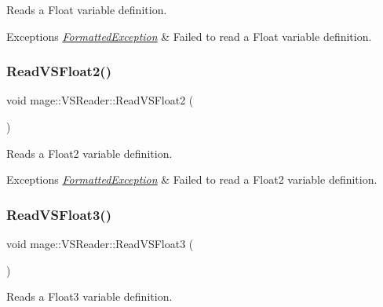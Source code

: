 Reads a Float variable definition.


\begin{DoxyExceptions}{Exceptions}
{\em \hyperlink{structmage_1_1_formatted_exception}{Formatted\+Exception}} & Failed to read a Float variable definition. \\
\hline
\end{DoxyExceptions}
\hypertarget{classmage_1_1_v_s_reader_a18c7821c219354d84f0071a5bfa8651c}{}\label{classmage_1_1_v_s_reader_a18c7821c219354d84f0071a5bfa8651c} 
\subsubsection{\texorpdfstring{Read\+V\+S\+Float2()}{ReadVSFloat2()}}
{\footnotesize\ttfamily void mage\+::\+V\+S\+Reader\+::\+Read\+V\+S\+Float2 (\begin{DoxyParamCaption}{ }\end{DoxyParamCaption})\hspace{0.3cm}{\ttfamily [private]}}

Reads a Float2 variable definition.


\begin{DoxyExceptions}{Exceptions}
{\em \hyperlink{structmage_1_1_formatted_exception}{Formatted\+Exception}} & Failed to read a Float2 variable definition. \\
\hline
\end{DoxyExceptions}
\hypertarget{classmage_1_1_v_s_reader_a63d8c0cb3108d8aa0f582a59b44db6ac}{}\label{classmage_1_1_v_s_reader_a63d8c0cb3108d8aa0f582a59b44db6ac} 
\subsubsection{\texorpdfstring{Read\+V\+S\+Float3()}{ReadVSFloat3()}}
{\footnotesize\ttfamily void mage\+::\+V\+S\+Reader\+::\+Read\+V\+S\+Float3 (\begin{DoxyParamCaption}{ }\end{DoxyParamCaption})\hspace{0.3cm}{\ttfamily [private]}}

Reads a Float3 variable definition.


